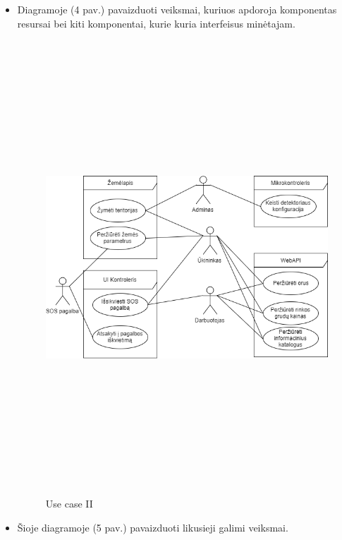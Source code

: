 \documentclass[oneside]{VUMIFPSkursinis}
\begin{document}
\begin{itemize}
\item Diagramoje (4 pav.) pavaizduoti veiksmai, kuriuos apdoroja komponentas resursai bei kiti komponentai, kurie kuria interfeisus minėtajam.

		\begin{figure}[H]
		\centering	
	\includegraphics[width=15cm,height=17cm,keepaspectratio]{UseCase2.png}
	\caption{Use case II}
	\label{fig:UseCaseFull}
\end{figure}
\item Šioje diagramoje (5 pav.) pavaizduoti likusieji galimi veiksmai.


\end{itemize}
\end{document}
